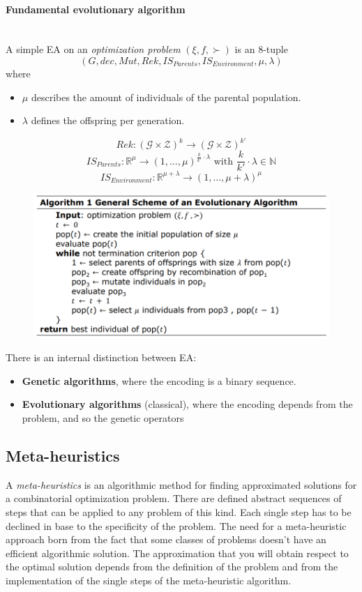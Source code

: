\documentclass{article}
\begin{document}
\paragraph{Fundamental evolutionary algorithm}\mbox{}\\
A simple EA on an \textit{optimization problem} $(\xi,f,\succ)$ is an 8-tuple
$$(G,dec,Mut,Rek,IS_{Parents},IS_{Environment},\mu,\lambda)$$
where
\begin{itemize}
    \item $\mu$ describes the amount of individuals of the parental population.
    \item $\lambda$ defines the offspring per generation.
\end{itemize}
$$Rek:(\mathcal{G}\times\mathcal{Z})^k\rightarrow(\mathcal{G}\times\mathcal{Z})^{k'}$$
$$IS_{Parents}:\mathbb{R}^\mu\rightarrow(1,\dots,\mu)^{\frac{k}{k'}\cdot\lambda}\text{ with }\frac{k}{k'}\cdot\lambda\in\mathbb{N}$$
$$IS_{Environment}:\mathbb{R}^{\mu+\lambda}\rightarrow(1,\dots,\mu+\lambda)^\mu$$
\begin{figure}[H]
    \centering
    \includegraphics[scale=0.5]{images/gen-scheme-ea.png}
\end{figure}
There is an internal distinction between EA:
\begin{itemize}
    \item \textbf{Genetic algorithms}, where the encoding is a binary sequence.
    \item \textbf{Evolutionary algorithms} (classical), where the encoding depends
          from the problem, and so the genetic operators
\end{itemize}

\subsection{Meta-heuristics}
A \textit{meta-heuristics} is an algorithmic method for finding approximated solutions for a
combinatorial optimization problem. There are defined abstract sequences of steps that can be applied
to any problem of this kind. Each single step has to be declined in base to the specificity of the problem.
\newline\newline
The need for a meta-heuristic approach born from the fact that some classes of problems doesn't
have an efficient algorithmic solution. The approximation that you will obtain respect to the
optimal solution depends from the definition of the problem and from the implementation of the single
steps of the meta-heuristic algorithm.
\end{document}

